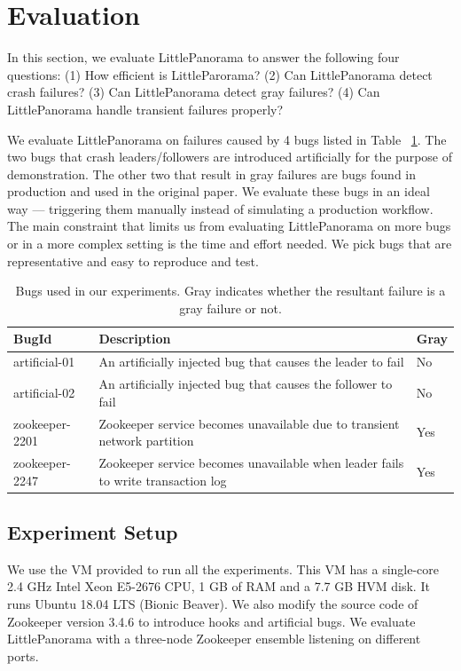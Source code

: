 \newpage
\newpage
\section{Evaluation}
In this section, we evaluate LittlePanorama to answer the following four questions: (1) How efficient is LittleParorama? (2) Can LittlePanorama detect crash failures? (3) Can LittlePanorama detect gray failures? (4) Can LittlePanorama handle transient failures properly?

We evaluate LittlePanorama on failures caused by 4 bugs listed in Table ~\ref{tab:failures}. The two bugs that crash leaders/followers are introduced artificially for the purpose of demonstration. The other two that result in gray failures are bugs found in production and used in the original paper. We evaluate these bugs in an ideal way --- triggering them manually instead of simulating a production workflow. The main constraint that limits us from evaluating LittlePanorama on more bugs or in a more complex setting is the time and effort needed. We pick bugs that are representative and easy to reproduce and test.

\begin{table}[!tb]
\begin{tabular}{p{}p{}p{}}%

\toprule
\textbf{BugId} & \textbf{Description} & \textbf{Gray} \\
\midrule
  artificial-01   &    An artificially injected bug that causes the leader to fail  &  No  \\
 artificial-02      &   An artificially injected bug that causes the follower to fail  &  No  \\  
zookeeper-2201      &   Zookeeper service becomes unavailable due to transient network partition &  Yes \\
zookeeper-2247      &   Zookeeper service becomes unavailable when leader fails to write transaction log &  Yes \\
\bottomrule
\end{tabular}
\vspace{0.5em}
\caption{Bugs used in our experiments. Gray indicates whether the resultant failure is a gray failure or not.}
\label{tab:failures}
\end{table}


\subsection{Experiment Setup}
We use the VM provided to run all the experiments. This VM has a single-core 2.4 GHz Intel Xeon E5-2676 CPU, 1 GB of RAM and a 7.7 GB HVM disk. It runs Ubuntu 18.04 LTS (Bionic Beaver). We also modify the source code of Zookeeper version 3.4.6 to introduce hooks and artificial bugs. We evaluate LittlePanorama with a three-node Zookeeper ensemble listening on different ports.

